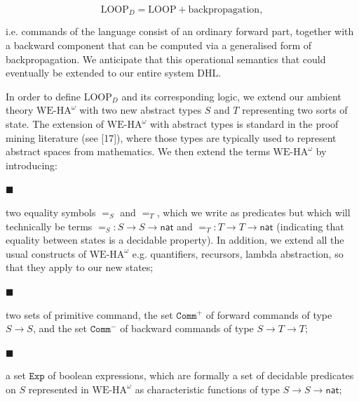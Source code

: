 \par  \quad  \[\mathrm{LOOP}_{D}=\mathrm{LOOP}+\text{backpropagation},\]\quad  \quad  
  
i.e. commands of the language consist of an ordinary forward part, together with a backward component that can be computed via a generalised form of backpropagation. We anticipate that this operational semantics that could eventually be extended to our entire system $\mathrm{DHL}$.\par
 
 
 
In order to define $\mathrm{LOOP}_{D}$ and its corresponding logic, we extend our ambient theory $\mathrm{WE}\mbox{-}\mathrm{HA}^{\omega}$ with two new abstract types $S$ and $T$ representing two sorts of state. The extension of $\mathrm{WE}\mbox{-}\mathrm{HA}^{\omega}$ with abstract types is standard in the proof mining literature (see [17]), where those types are typically used to represent abstract spaces from mathematics. We then extend the terms $\mathrm{WE}\mbox{-}\mathrm{HA}^{\omega}$ by introducing:\par
  
\par\noindent  $\blacksquare$ 
 
two equality symbols $=_{S}$ and $=_{T}$, which we write as predicates but which will technically be terms $=_{S}:S\to S\to\mathsf{nat}$ and $=_{T}:T\to T\to\mathsf{nat}$ (indicating that equality between states is a decidable property). In addition, we extend all the usual constructs of $\mathrm{WE}\mbox{-}\mathrm{HA}^{\omega}$ e.g. quantifiers, recursors, lambda abstraction, so that they apply to our new states;\par
 
 
 
\par\noindent  $\blacksquare$ 
 
two sets of primitive command, the set $\mathtt{Comm}^{+}$ of forward commands of type $S\to S$, and the set $\mathtt{Comm}^{-}$ of backward commands of type $S\to T\to T$;\par
 
 
 
\par\noindent  $\blacksquare$ 
 
a set $\mathtt{Exp}$ of boolean expressions, which are formally a set of decidable predicates on $S$ represented in $\mathrm{WE}\mbox{-}\mathrm{HA}^{\omega}$ as characteristic functions of type $S\to S\to\mathsf{nat}$;\par
 

